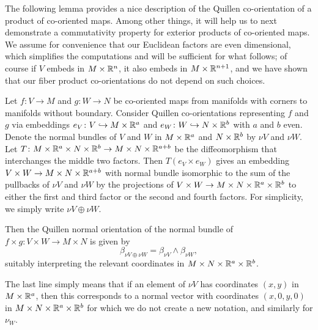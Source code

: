 The following lemma provides a nice description of the Quillen co-orientation of a product of co-oriented maps.
Among other things, it will help us to next demonstrate a commutativity property for exterior products of co-oriented maps.
We assume for convenience that our Euclidean factors are even dimensional, which simplifies the computations and will be sufficient for what follows; of course if $V$ embeds in $M \times \mathbb{R}^n$, it also embeds in $M \times \mathbb{R}^{n+1}$, and we have shown that our fiber product co-orientations do not depend on such choices. 

\begin{lemma}\label{L: Quillen product co-orientation}
	Let $f \colon V \to M$ and $g \colon W \to N$ be co-oriented maps from manifolds with corners to manifolds without boundary.
	Consider Quillen co-orientations representing $f$ and $g$ via embeddings $e_V \colon V \hookrightarrow M \times \mathbb{R}^a$ and $e_W \colon W \hookrightarrow N \times \mathbb{R}^b$ with $a$ and $b$ even.
	Denote the normal bundles of $V$ and $W$ in $M \times \mathbb{R}^a$ and $N \times \mathbb{R}^b$ by $\nu V$ and $\nu W$.
	Let $T \colon M \times \mathbb{R}^a \times N \times \mathbb{R}^b \to M \times N \times \mathbb{R}^{a+b}$ be the diffeomorphism that interchanges the middle two factors.
	Then
	$T(e_V \times e_W)$ gives an embedding $V \times W \to M \times N \times \mathbb{R}^{a+b}$ with normal bundle isomorphic to the sum of the pullbacks of $\nu V$ and $\nu W$ by the projections of $V \times W \to M \times N \times \mathbb{R}^a \times \mathbb{R}^b$ to either the first and third factor or the second and fourth factors.
	For simplicity, we simply write $\nu V \oplus \nu W$.

	Then the Quillen normal orientation of the normal bundle of $f \times g \colon V \times W \to M \times N$ is given by $$\beta_{\nu V \oplus \nu W} = \beta_{\nu V} \wedge \beta_{\nu W},$$
	suitably interpreting the relevant coordinates in $M \times N \times \mathbb{R}^a \times \mathbb{R}^b$.
\end{lemma}

The last line simply means that if an element of $\nu V$ has coordinates $(x,y)$ in $M \times \mathbb{R}^a$, then this corresponds to a normal vector with coordinates $(x,0,y,0)$ in $M \times N \times \mathbb{R}^a \times \mathbb{R}^b$ for which we do not create a new notation, and similarly for $\nu_W$. 

